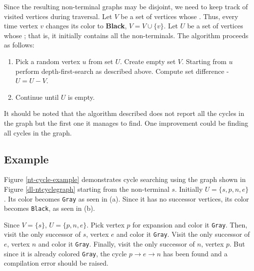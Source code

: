 Since the resulting non-terminal graphs may be disjoint, we need to keep track of visited vertices during traversal. Let $V$ be a set of vertices whose . Thus, every time vertex $v$ changes its color to \textbf{Black}, $V = V \cup \{v\} $. Let $U$ be a set of vertices whose ; that is, it initially contains all the non-terminals. The algorithm proceeds as follows:

\begin{enumerate}
\item
Pick a random vertex $u$ from set $U$. Create empty set $V$. Starting from $u$ perform depth-first-search as described above. Compute set difference - $U = U-V$.
\item
Continue until $U$ is empty.
\end{enumerate}

It should be noted that the algorithm described does not report all the cycles in the graph but the first one it manages to find. One improvement could be finding all cycles in the graph.

\subsection{Example}

Figure \ref{nt-cycle-example} demonstrates cycle searching using the graph shown in Figure \ref{dl-ntcyclegraph} starting from the non-terminal $s$. Initially $U=\{s,p,n,e\}$. Its color becomes \texttt{Gray} as seen in (a). Since it has no successor vertices, its color becomes \texttt{Black}, as seen in (b).

Since $V = \{ s \}$, $U=\{p,n,e\}$. Pick vertex $p$ for expansion and color it \texttt{Gray}. Then, visit the only successor of $s$, vertex $e$ and color it \texttt{Gray}. Visit the only successor of $e$, vertex $n$ and color it \texttt{Gray}. Finally, visit the only successor of $n$, vertex $p$. But since it is already colored \texttt{Gray}, the cycle  $p \rightarrow e \rightarrow n$ has been found and a compilation error should be raised.

